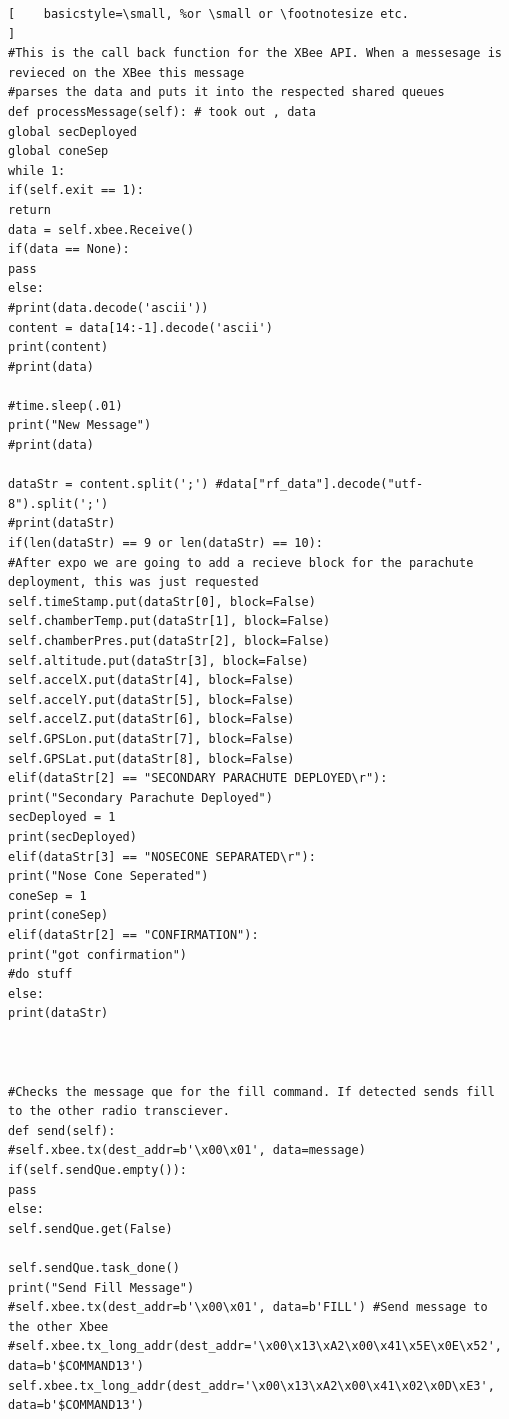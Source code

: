 \documentclass[10pt,draftclsnofoot,onecolumn,retainorgcmds]{IEEEtran}
\begin{document}
\begin{lstlisting}[    basicstyle=\small, %or \small or \footnotesize etc.
]
#This is the call back function for the XBee API. When a messesage is revieced on the XBee this message 
#parses the data and puts it into the respected shared queues
def processMessage(self): # took out , data
global secDeployed
global coneSep
while 1:
if(self.exit == 1):
return
data = self.xbee.Receive()
if(data == None):
pass
else:
#print(data.decode('ascii'))
content = data[14:-1].decode('ascii')
print(content)
#print(data)

#time.sleep(.01)
print("New Message")
#print(data)

dataStr = content.split(';') #data["rf_data"].decode("utf-8").split(';')
#print(dataStr)
if(len(dataStr) == 9 or len(dataStr) == 10):
#After expo we are going to add a recieve block for the parachute deployment, this was just requested 
self.timeStamp.put(dataStr[0], block=False)
self.chamberTemp.put(dataStr[1], block=False)
self.chamberPres.put(dataStr[2], block=False)
self.altitude.put(dataStr[3], block=False)
self.accelX.put(dataStr[4], block=False)
self.accelY.put(dataStr[5], block=False)
self.accelZ.put(dataStr[6], block=False)
self.GPSLon.put(dataStr[7], block=False)
self.GPSLat.put(dataStr[8], block=False)
elif(dataStr[2] == "SECONDARY PARACHUTE DEPLOYED\r"):
print("Secondary Parachute Deployed")
secDeployed = 1
print(secDeployed)
elif(dataStr[3] == "NOSECONE SEPARATED\r"):
print("Nose Cone Seperated")
coneSep = 1
print(coneSep)
elif(dataStr[2] == "CONFIRMATION"):
print("got confirmation")
#do stuff
else:
print(dataStr)



#Checks the message que for the fill command. If detected sends fill to the other radio transciever.
def send(self):
#self.xbee.tx(dest_addr=b'\x00\x01', data=message)
if(self.sendQue.empty()):
pass
else:
self.sendQue.get(False)

self.sendQue.task_done()
print("Send Fill Message")
#self.xbee.tx(dest_addr=b'\x00\x01', data=b'FILL') #Send message to the other Xbee
#self.xbee.tx_long_addr(dest_addr='\x00\x13\xA2\x00\x41\x5E\x0E\x52', data=b'$COMMAND13')
self.xbee.tx_long_addr(dest_addr='\x00\x13\xA2\x00\x41\x02\x0D\xE3', data=b'$COMMAND13')


\end{lstlisting}
\end{document}
